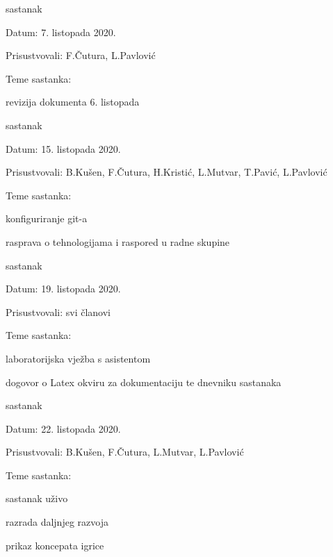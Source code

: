 \begin{packed_enum}
						\item  sastanak
			\item[] \begin{packed_item}
				\item Datum: 7. listopada 2020.
				\item Prisustvovali: F.Čutura, L.Pavlović
				\item Teme sastanka:
				\begin{packed_item}
					\item  revizija dokumenta 6. listopada
				\end{packed_item}
			\end{packed_item}
		
						\item  sastanak
			\item[] \begin{packed_item}
				\item Datum: 15. listopada 2020.
				\item Prisustvovali: B.Kušen, F.Čutura, H.Kristić, L.Mutvar, T.Pavić, L.Pavlović
				\item Teme sastanka:
				\begin{packed_item}
					\item  konfiguriranje git-a
					\item rasprava o tehnologijama i raspored u radne skupine
				\end{packed_item}
			\end{packed_item}
		
			\item  sastanak
			\item[] \begin{packed_item}
				\item Datum: 19. listopada 2020.
				\item Prisustvovali: svi članovi
				\item Teme sastanka:
				\begin{packed_item}
					\item  laboratorijska vježba s asistentom
					\item dogovor o Latex okviru za dokumentaciju te dnevniku sastanaka  
				\end{packed_item}
			\end{packed_item}
		
		\item  sastanak
		\item[] \begin{packed_item}
			\item Datum: 22. listopada 2020.
			\item Prisustvovali: B.Kušen, F.Čutura, L.Mutvar, L.Pavlović
			\item Teme sastanka:
			\begin{packed_item}
				\item  sastanak uživo 
				\item razrada daljnjeg razvoja 
				\item prikaz koncepata igrice
			\end{packed_item}
		\end{packed_item}
	

\end{packed_enum}

